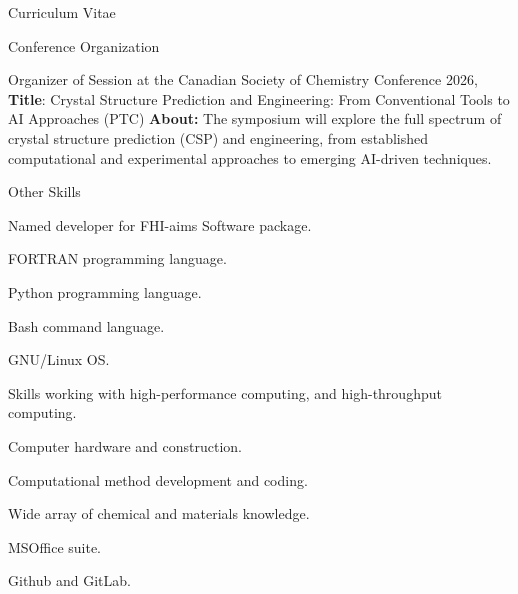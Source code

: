 \documentclass[a4paper,oneside,11pt]{article}
\begin{document}
\begin{cv}{Curriculum Vitae}
  \begin{cvlist}{Conference Organization}

  \item[] Organizer of Session at the Canadian Society of Chemistry Conference 2026, \textbf{Title}: Crystal Structure Prediction and Engineering: From Conventional Tools to AI Approaches (PTC) \textbf{About:} The symposium will explore the full spectrum of crystal structure prediction (CSP) and engineering, from established computational and experimental approaches to emerging AI-driven techniques.
      
   \end{cvlist}

  \begin{cvlist}{Other Skills}
  \item[] Named developer for FHI-aims Software package.
  \item[] FORTRAN programming language.
  \item[] Python programming language.
  \item[] Bash command language. 
  \item[] GNU/Linux OS.
  \item[] Skills working with high-performance computing, and high-throughput computing. 
  \item[] Computer hardware and construction.
  \item[] Computational method development and coding.
  \item[] Wide array of chemical and materials knowledge.
  \item[] MSOffice suite.
  \item[] Github and GitLab.
  \end{cvlist}
  

\end{cv}
\end{document}
